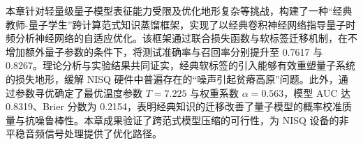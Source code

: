本章针对轻量级量子模型表征能力受限及优化地形复杂等挑战，构建了一种“经典教师-量子学生”跨计算范式知识蒸馏框架，实现了以经典卷积神经网络指导量子时频分析神经网络的自适应优化。该框架通过联合损失函数与软标签迁移机制，在不增加额外量子参数的条件下，将测试准确率与召回率分别提升至 0.7617 与 0.8267。理论分析与实验结果共同证实，经典软标签的引入能够有效重塑量子系统的损失地形，缓解 NISQ 硬件中普遍存在的“噪声引起贫瘠高原”问题。此外，通过参数寻优确定了最优温度参数 $T=7.225$ 与权重系数 $\alpha=0.563$，模型 AUC 达 0.8319、Brier 分数为 0.2154，表明经典知识的迁移改善了量子模型的概率校准质量与抗噪鲁棒性。本章成果验证了跨范式模型压缩的可行性，为 NISQ 设备的非平稳音频信号处理提供了优化路径。
